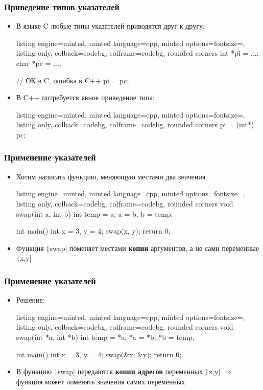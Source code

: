 \documentclass[10pt]{beamer}
\begin{document}
\begin{frame}[fragile]
\frametitle{Приведение типов указателей}
\begin{itemize}
\item В языке C любые типы указателей приводятся друг к другу:
\begin{tcblisting}{listing engine=minted, minted language=cpp, minted options={fontsize=\scriptsize}, listing only, colback=codebg, colframe=codebg, rounded corners}
int  *pi = ...;
char *pc = ...;

// ОК в C, ошибка в C++
pi = pc;
\end{tcblisting}
\pause
\item В C++ потребуется явное приведение типа:
\begin{tcblisting}{listing engine=minted, minted language=cpp, minted options={fontsize=\scriptsize}, listing only, colback=codebg, colframe=codebg, rounded corners}
pi = (int*) pc;
\end{tcblisting}
\end{itemize}
\end{frame}

\begin{frame}[fragile]
\frametitle{Применение указателей}
\begin{itemize}
\item Хотим написать функцию, меняющую местами два значения
\begin{tcblisting}{listing engine=minted, minted language=cpp, minted options={fontsize=\scriptsize}, listing only, colback=codebg, colframe=codebg, rounded corners}
void swap(int a, int b) {
  int temp = a;
  a = b;
  b = temp;
}

int main() {
  int x = 3, y = 4;
  swap(x, y);
  return 0;
}
\end{tcblisting}
\pause
{}
\item Функция \texttt|swap| поменяет местами \textbf{копии} аргументов, а не сами переменные \texttt|x,y|
\end{itemize}
\end{frame}

\begin{frame}[fragile]
\frametitle{Применение указателей}
\begin{itemize}
\item Решение:
\begin{tcblisting}{listing engine=minted, minted language=cpp, minted options={fontsize=\scriptsize}, listing only, colback=codebg, colframe=codebg, rounded corners}
void swap(int *a, int *b) {
  int temp = *a;
  *a = *b;
  *b = temp;
}

int main() {
  int x = 3, y = 4;
  swap(&x, &y);
  return 0;
}
\end{tcblisting}
\pause
{}
\item В функцию \texttt|swap| передаются \textbf{копии адресов} переменных \texttt|x,y| \(\Longrightarrow\) функция может поменять значения самих переменных
\end{itemize}
\end{frame}
\end{document}
